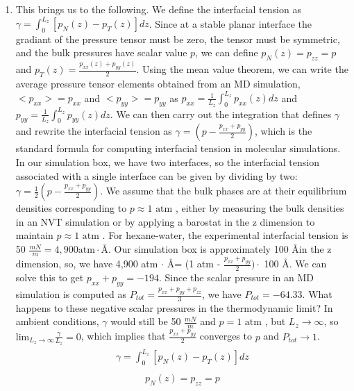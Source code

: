 \documentclass[12pt,reqno]{amsart}
\numberwithin{equation}{section}
\begin{document}
\begin{enumerate}
\item This brings us to the following.  We define the interfacial tension as $\gamma = \int_0^{L_z}[p_N(z) - p_T(z)]dz$.  Since at a stable planar interface the gradiant of the pressure tensor must be zero, the tensor must be symmetric, and the bulk pressures have scalar value $p$, we can define $p_N(z) = p_{zz} = p$ and $p_T(z) = \frac{p_{xx}(z) + p_{yy}(z)}{2}$.  Using the mean value theorem, we can write the average pressure tensor elements obtained from an MD simulation, $<p_{xx}> = p_{xx}$ and $<p_{yy}> = p_{yy}$ as $p_{xx} = \frac{1}{L_z}\int_0^{L_z}p_{xx}(z)dz$ and $p_{yy} = \frac{1}{L_z}\int_0^{L_z}p_{yy}(z)dz$.  We can then carry out the integration that defines $\gamma$ and rewrite the interfacial tension as $\gamma = (p - \frac{p_{xx} + p_{yy}}{2})$, which is the standard formula for computing interfacial tension in molecular simulations.  In our simulation box, we have two interfaces, so the interfacial tension associated with a single interface can be given by dividing by two:  $\gamma = \frac{1}{2}(p - \frac{p_{xx} + p_{yy}}{2})$.  We assume that the bulk phases are at their equilibrium densities corresponding to $p \approx 1 \text{ atm }$, either by measuring the bulk densities in an NVT simulation or by applying a barostat in the z dimension to maintain $p \approx 1 \text{ atm }$.  For hexane-water, the experimental interfacial tension is 50 $\frac{mN}{m} = 4, 900 \text{atm}\cdot $\AA.  Our simulation box is approximately 100 \AA in the z dimension, so, we have 4,900 atm $\cdot$ \AA = (1 atm - $\frac{p_{xx} + p_{yy}}{2})\cdot$ 100 \AA.  We can solve this to get $p_{xx} + p_{yy} = -194$.  Since the scalar pressure in an MD simulation is computed as $P_{tot} = \frac{p_{xx} + p_{yy} + p_{zz}}{3}$, we have $P_{tot} = -64.33$.  What happens to these negative scalar pressures in the thermodynamic limit?  In ambient conditions, $\gamma$ would still be 50 $\frac{mN}{m}$ and $p = 1 \text{ atm }$, but $L_z\rightarrow\infty$, so $\text{lim}_{L_z\rightarrow\infty}\frac{\gamma}{L_z} = 0$, which implies that $\frac{p_{xx} + p_{yy}}{2}$ converges to $p$ and $P_{tot} \rightarrow 1$. 
\begin{align}
\begin{split}
\gamma = \int_{0}^{L_z}[p_N(z) - p_T(z)]dz
\end{split}
\end{align} 
\begin{align}
\begin{split}
p_N(z) = p_{zz} = p
\end{split}
\end{align} 

\end{enumerate}
\end{document}
